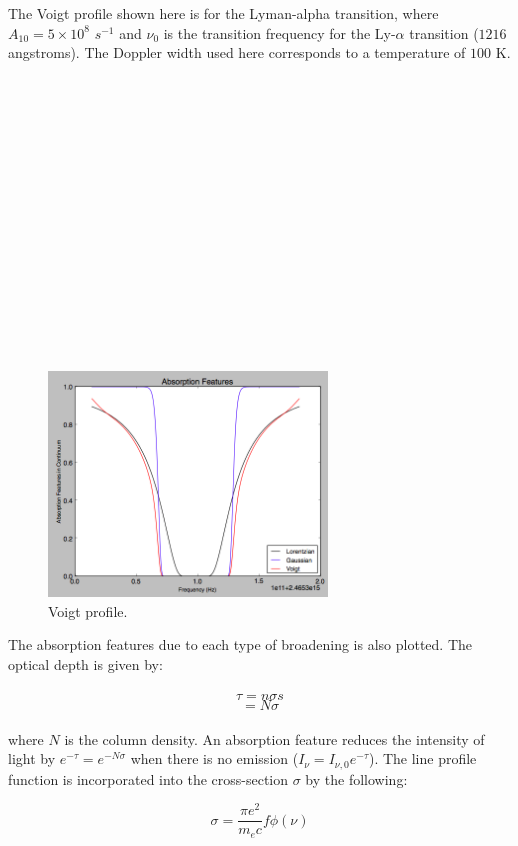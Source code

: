 \documentclass{article}
\begin{document}
The Voigt profile shown here is for the Lyman-alpha transition, where $A_{10} = 5 \times 10^{8}$ $s^{-1}$ and $\nu_{0}$ is the transition frequency for the Ly-$\alpha$ transition ($1216$ angstroms). The Doppler width used here corresponds to a temperature of $100$ K.\\ \\ \\ \\ \\ \\ \\ \\ \\ \\ \\ \\ \\ \\ \\ \\

\begin{figure}[ht]
    \centering
    \includegraphics[width=0.66\textwidth]{hw11pic2.png}
    \caption{Voigt profile.}
    \label{fig:voigt2}
\end{figure}

The absorption features due to each type of broadening is also plotted. The optical depth is given by: \\ \\
$$\tau = n \sigma s$$ 
$$ = N\sigma$$ \\

where $N$ is the column density. An absorption feature reduces the intensity of light by $e^{-\tau} = e^{-N\sigma}$ when there is no emission ($I_{\nu} = I_{\nu,0}e^{-\tau}$). The line profile function is incorporated into the cross-section $\sigma$ by the following:

$$\sigma = {\frac{\pi e^{2}}{m_{e}c}}f\phi(\nu)$$ \\
\end{document}
